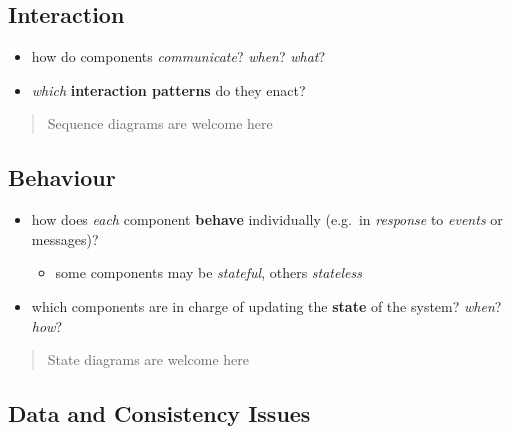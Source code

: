 \documentclass{scrartcl}
\begin{document}
\subsection{Interaction}\label{interaction}

\begin{itemize}
  \item how do components \emph{communicate}? \emph{when}? \emph{what}?
  \item \emph{which} \textbf{interaction patterns} do they enact?
\end{itemize}

\begin{quote}
Sequence diagrams are welcome here
\end{quote}

\subsection{Behaviour}\label{behaviour}

\begin{itemize}
  \item how does \emph{each} component \textbf{behave} individually (e.g.~in \emph{response} to \emph{events} or messages)?
  \begin{itemize}
    \item some components may be \emph{stateful}, others \emph{stateless}
  \end{itemize}

  \item which components are in charge of updating the \textbf{state} of the system? \emph{when}? \emph{how}?
\end{itemize}

\begin{quote}
State diagrams are welcome here
\end{quote}

\subsection{Data and Consistency Issues}\label{data-and-consistency-issues}
\end{document}
